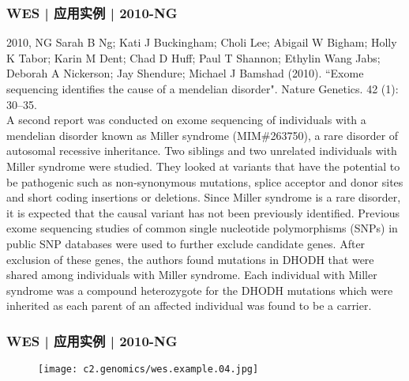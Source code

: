 \begin{frame}
  \frametitle{WES | 应用实例 | 2010-NG}
  \footnotesize{
    \begin{block}{2010, NG}
  Sarah B Ng; Kati J Buckingham; Choli Lee; Abigail W Bigham; Holly K Tabor; Karin M Dent; Chad D Huff; Paul T Shannon; Ethylin Wang Jabs; Deborah A Nickerson; Jay Shendure; Michael J Bamshad (2010). ``Exome sequencing identifies the cause of a mendelian disorder". Nature Genetics. 42 (1): 30–35.\\
  \vspace{1em}
  A second report was conducted on exome sequencing of individuals with a mendelian disorder known as Miller syndrome (MIM\#263750), a rare disorder of autosomal recessive inheritance. Two siblings and two unrelated individuals with Miller syndrome were studied. They looked at variants that have the potential to be pathogenic such as non-synonymous mutations, splice acceptor and donor sites and short coding insertions or deletions. Since Miller syndrome is a rare disorder, it is expected that the causal variant has not been previously identified. Previous exome sequencing studies of common single nucleotide polymorphisms (SNPs) in public SNP databases were used to further exclude candidate genes. After exclusion of these genes, the authors found mutations in DHODH that were shared among individuals with Miller syndrome. Each individual with Miller syndrome was a compound heterozygote for the DHODH mutations which were inherited as each parent of an affected individual was found to be a carrier.
    \end{block}
}
\end{frame}

\begin{frame}
  \frametitle{WES | 应用实例 | 2010-NG}
  \begin{figure}
    \centering
    \texttt{[image: c2.genomics/wes.example.04.jpg]}
  \end{figure}
\end{frame}

